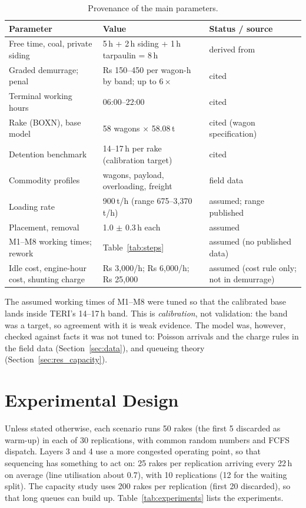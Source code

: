 \begin{table}[!htbp]
\centering
\caption[Provenance of the main parameters]{Provenance of the main parameters.}
\label{tab:prov}
\small
\begin{tabularx}{\textwidth}{@{}p{4.4cm} X p{4.2cm}@{}}
\toprule
\textbf{Parameter} & \textbf{Value} & \textbf{Status / source} \\
\midrule
Free time, coal, private siding & 5\,h + 2\,h siding + 1\,h tarpaulin = 8\,h & derived from \cite{ircomp} \\
Graded demurrage; penal & Rs 150--450 per wagon-h by band; up to $6\times$ & cited \cite{ircomp} \\
Terminal working hours & 06:00--22:00 & cited \cite{ircomp} \\
Rake (BOXN), base model & 58 wagons $\times$ 58.08\,t & cited (wagon specification) \\
Detention benchmark & 14--17\,h per rake (calibration target) & cited \cite{teri} \\
Commodity profiles & wagons, payload, overloading, freight & field data \cite{errr} \\
Loading rate & 900\,t/h (range 675--3,370\,t/h) & assumed; range published \cite{pib} \\
Placement, removal & 1.0 $\pm$ 0.3\,h each & assumed \\
M1--M8 working times; rework & Table~\ref{tab:steps} & assumed (no published data) \\
Idle cost, engine-hour cost, shunting charge & Rs 3,000/h; Rs 6,000/h; Rs 25,000 & assumed (cost rule only; not in demurrage) \\
\bottomrule
\end{tabularx}
\end{table}

The assumed working times of M1--M8 were tuned so that the calibrated base lands inside TERI's 14--17\,h band. This is \emph{calibration}, not validation: the band was a target, so agreement with it is weak evidence. The model was, however, checked against facts it was not tuned to: Poisson arrivals and the charge rules in the field data (Section~\ref{sec:data}), and queueing theory (Section~\ref{sec:res_capacity}).

\section{Experimental Design}
\label{sec:design}
Unless stated otherwise, each scenario runs 50 rakes (the first 5 discarded as warm-up) in each of 30 replications, with common random numbers and FCFS dispatch. Layers 3 and 4 use a more congested operating point, so that sequencing has something to act on: 25 rakes per replication arriving every 22\,h on average (line utilisation about 0.7), with 10 replications (12 for the waiting split). The capacity study uses 200 rakes per replication (first 20 discarded), so that long queues can build up. Table~\ref{tab:experiments} lists the experiments.

